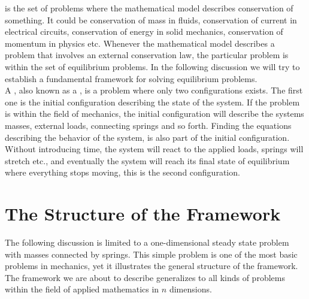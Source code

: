 
\label{sec:framework_for_equilibrium_problems}
 is the set of problems
where the mathematical model describes conservation of something. It could be
conservation of mass in fluids, conservation of current in electrical
circuits, conservation of energy in solid mechanics, conservation of
momentum in physics etc. Whenever the mathematical model describes a problem
that involves an external conservation law, %
the particular problem is within the set of
equilibrium problems. In the following discussion we will try to
establish a fundamental framework for solving equilibrium problems.\\

 
A , also known as a , is a problem where only
two configurations exists.  
The first one is the initial configuration describing the state of the
system. If the problem is within the field of mechanics, the initial
configuration will describe the systems masses, external loads, connecting springs and
so forth. Finding the equations describing the behavior of the
system, is also part of the initial configuration.
Without introducing time, the system will react to the applied loads,
springs will stretch etc., and eventually the system will reach its final
state of equilibrium where everything stops moving, this is the second configuration. \\


\section{The Structure of the Framework}
The following discussion is limited to a one-dimensional steady state
problem with masses connected by springs. This simple problem is one of the most
basic problems in mechanics, yet it illustrates the general
structure of the framework. The framework we are about to describe
generalizes to all kinds of problems within the field of applied mathematics in
$n$ dimensions. \\ 

